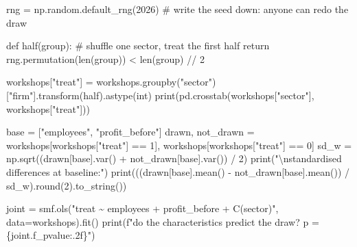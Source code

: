 \documentclass[
  letterpaper,
  10pt,
  twoside,
  openright,
  numbers=noenddot,
  chapterprefix=true]{scrbook}
\newenvironment{Shaded}{}{}
\newcommand{\BuiltInTok}[1]{\textcolor[rgb]{0.84,0.23,0.29}{#1}}
\newcommand{\CharTok}[1]{\textcolor[rgb]{0.01,0.18,0.38}{#1}}
\newcommand{\CommentTok}[1]{\textcolor[rgb]{0.42,0.45,0.49}{#1}}
\newcommand{\ControlFlowTok}[1]{\textcolor[rgb]{0.84,0.23,0.29}{#1}}
\newcommand{\DecValTok}[1]{\textcolor[rgb]{0.00,0.36,0.77}{#1}}
\newcommand{\KeywordTok}[1]{\textcolor[rgb]{0.84,0.23,0.29}{#1}}
\newcommand{\NormalTok}[1]{\textcolor[rgb]{0.14,0.16,0.18}{#1}}
\newcommand{\OperatorTok}[1]{\textcolor[rgb]{0.14,0.16,0.18}{#1}}
\newcommand{\SpecialCharTok}[1]{\textcolor[rgb]{0.00,0.36,0.77}{#1}}
\newcommand{\SpecialStringTok}[1]{\textcolor[rgb]{0.01,0.18,0.38}{#1}}
\newcommand{\StringTok}[1]{\textcolor[rgb]{0.01,0.18,0.38}{#1}}
\begin{document}
\label{check-trial-draw}
\begin{Shaded}
\begin{Highlighting}[]
\NormalTok{rng }\OperatorTok{=}\NormalTok{ np.random.default\_rng(}\DecValTok{2026}\NormalTok{)              }\CommentTok{\# write the seed down: anyone can redo the draw}


\KeywordTok{def}\NormalTok{ half(group):                               }\CommentTok{\# shuffle one sector, treat the first half}
    \ControlFlowTok{return}\NormalTok{ rng.permutation(}\BuiltInTok{len}\NormalTok{(group)) }\OperatorTok{\textless{}} \BuiltInTok{len}\NormalTok{(group) }\OperatorTok{//} \DecValTok{2}


\NormalTok{workshops[}\StringTok{"treat"}\NormalTok{] }\OperatorTok{=}\NormalTok{ workshops.groupby(}\StringTok{"sector"}\NormalTok{)[}\StringTok{"firm"}\NormalTok{].transform(half).astype(}\BuiltInTok{int}\NormalTok{)}
\BuiltInTok{print}\NormalTok{(pd.crosstab(workshops[}\StringTok{"sector"}\NormalTok{], workshops[}\StringTok{"treat"}\NormalTok{]))}

\NormalTok{base }\OperatorTok{=}\NormalTok{ [}\StringTok{"employees"}\NormalTok{, }\StringTok{"profit\_before"}\NormalTok{]}
\NormalTok{drawn, not\_drawn }\OperatorTok{=}\NormalTok{ workshops[workshops[}\StringTok{"treat"}\NormalTok{] }\OperatorTok{==} \DecValTok{1}\NormalTok{], workshops[workshops[}\StringTok{"treat"}\NormalTok{] }\OperatorTok{==} \DecValTok{0}\NormalTok{]}
\NormalTok{sd\_w }\OperatorTok{=}\NormalTok{ np.sqrt((drawn[base].var() }\OperatorTok{+}\NormalTok{ not\_drawn[base].var()) }\OperatorTok{/} \DecValTok{2}\NormalTok{)}
\BuiltInTok{print}\NormalTok{(}\StringTok{"}\CharTok{\textbackslash{}n}\StringTok{standardised differences at baseline:"}\NormalTok{)}
\BuiltInTok{print}\NormalTok{(((drawn[base].mean() }\OperatorTok{{-}}\NormalTok{ not\_drawn[base].mean()) }\OperatorTok{/}\NormalTok{ sd\_w).}\BuiltInTok{round}\NormalTok{(}\DecValTok{2}\NormalTok{).to\_string())}

\NormalTok{joint }\OperatorTok{=}\NormalTok{ smf.ols(}\StringTok{"treat \textasciitilde{} employees + profit\_before + C(sector)"}\NormalTok{, data}\OperatorTok{=}\NormalTok{workshops).fit()}
\BuiltInTok{print}\NormalTok{(}\SpecialStringTok{f"do the characteristics predict the draw?  p = }\SpecialCharTok{\{}\NormalTok{joint}\SpecialCharTok{.}\NormalTok{f\_pvalue}\SpecialCharTok{:.2f\}}\SpecialStringTok{"}\NormalTok{)}
\end{Highlighting}
\end{Shaded}
\end{document}
